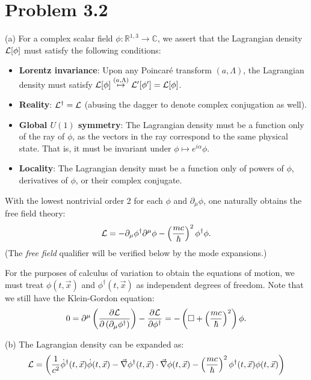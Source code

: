 \documentclass[11pt]{article}
\begin{document}
\section*{Problem 3.2}
\noindent
(a) For a complex scalar field $\phi : \mathbb{R}^{1,3} \rightarrow \mathbb{C}$,
we assert that the Lagrangian density $\mathcal{L}[\phi]$ must satisfy the following conditions:
\begin{itemize}
    \item \textbf{Lorentz invariance}:
        Upon any Poincar\'e transform $(a,\Lambda)$, the Lagrangian density must satisfy
        $\mathcal{L}[\phi]\overset{(a,\Lambda)}{\mapsto} \mathcal{L}'[\phi'] = \mathcal{L}[\phi]$.

    \item \textbf{Reality}: $\mathcal{L}^\dagger = \mathcal{L}$
        (abusing the dagger to denote complex conjugation as well).

    \item \textbf{Global $U(1)$ symmetry}:
        The Lagrangian density must be a function only of the ray of $\phi$,
        as the vectors in the ray correspond to the same physical state.
        That is, it must be invariant under $\phi \mapsto e^{i\alpha} \phi$.

    \item \textbf{Locality}:
        The Lagrangian density must be a function only of powers of $\phi$,
        derivatives of $\phi$, or their complex conjugate.
\end{itemize}
With the lowest nontrivial order 2 for each $\phi$ and $\partial_\mu \phi$,
one naturally obtains the free field theory:
\[
    \mathcal{L} = -\partial_\mu\phi^\dagger\partial^\mu\phi
        - \left(\frac{mc}{\hbar}\right)^2 \phi^\dagger\phi.
\]
(The \emph{free field} qualifier will be verified below by the mode expansions.)

For the purposes of calculus of variation to obtain the equations of motion,
we must treat $\phi(t,\vec{x})$ and $\phi^\dagger(t,\vec{x})$ as independent degrees of freedom.
Note that we still have the Klein-Gordon equation:
\[
    0
    = \partial^\mu\left(
        \frac{\partial\mathcal{L}}{\partial\left(\partial_\mu\phi^\dagger\right)}
    \right) - \frac{\partial\mathcal{L}}{\partial\phi^\dagger}
    = -\left(\square + \left(\frac{mc}{\hbar}\right)^2\right)\phi.
\]

\noindent
(b) The Lagrangian density can be expanded as:
\[
    \mathcal{L} = \left(
        \frac{1}{c^2} \dot{\phi}^\dagger(t,\vec{x})\dot{\phi}(t,\vec{x})
        - \vec{\nabla}\phi^\dagger(t,\vec{x}) \cdot \vec{\nabla}\phi(t,\vec{x})
        - \left(\frac{mc}{\hbar}\right)^2 \phi^\dagger(t,\vec{x})\phi(t,\vec{x})
    \right)
\]
\end{document}

